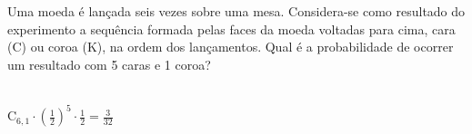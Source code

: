 \begin{ex}
Uma moeda é lançada seis vezes sobre uma mesa. Considera-se como resultado do experimento a sequência formada pelas faces da moeda voltadas para cima, cara (C) ou coroa (K), na ordem dos lançamentos. Qual é a probabilidade de ocorrer um resultado com 5 caras e 1 coroa?
  \begin{sol}
     \phantom{A} \\
     $\mathrm{C}_{6,1}\cdot(\frac{1}{2})^5\cdot\frac{1}{2}=\frac{3}{32}$
  \end{sol}
\end{ex}